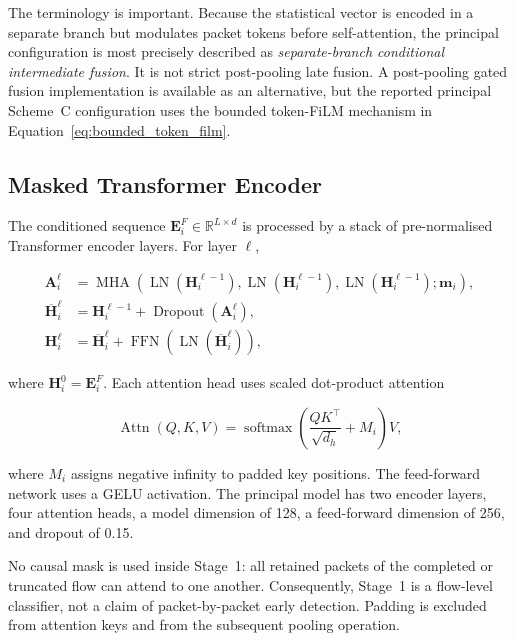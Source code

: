 \documentclass[11pt,fleqn]{report}
\begin{document}
The terminology is important. Because the statistical vector is encoded in a separate branch but modulates packet tokens before self-attention, the principal configuration is most precisely described as \emph{separate-branch conditional intermediate fusion}. It is not strict post-pooling late fusion. A post-pooling gated fusion implementation is available as an alternative, but the reported principal Scheme~C configuration uses the bounded token-FiLM mechanism in Equation~\ref{eq:bounded_token_film}.

\subsection{Masked Transformer Encoder}
\label{subsubsec:stage1_transformer}

The conditioned sequence $\mathbf{E}^{F}_i\in\mathbb{R}^{L\times d}$ is processed by a stack of pre-normalised Transformer encoder layers. For layer $\ell$,

\begin{align}
    \mathbf{A}^{\ell}_i
    &=\operatorname{MHA}
      \left(
        \operatorname{LN}(\mathbf{H}^{\ell-1}_i),
        \operatorname{LN}(\mathbf{H}^{\ell-1}_i),
        \operatorname{LN}(\mathbf{H}^{\ell-1}_i);
        \mathbf{m}_i
      \right),\\
    \overline{\mathbf{H}}^{\ell}_i
    &=\mathbf{H}^{\ell-1}_i
      +\operatorname{Dropout}(\mathbf{A}^{\ell}_i),\\
    \mathbf{H}^{\ell}_i
    &=\overline{\mathbf{H}}^{\ell}_i
      +\operatorname{FFN}
       \left(\operatorname{LN}(\overline{\mathbf{H}}^{\ell}_i)\right),
    \label{eq:stage1_transformer_layer}
\end{align}

where $\mathbf{H}^{0}_i=\mathbf{E}^{F}_i$. Each attention head uses scaled dot-product attention

\begin{equation}
    \operatorname{Attn}(Q,K,V)
    =\operatorname{softmax}
      \left(
        \frac{QK^{\top}}{\sqrt{d_h}}+M_i
      \right)V,
    \label{eq:scaled_dot_product_attention}
\end{equation}

where $M_i$ assigns negative infinity to padded key positions. The feed-forward network uses a GELU activation. The principal model has two encoder layers, four attention heads, a model dimension of 128, a feed-forward dimension of 256, and dropout of 0.15.

No causal mask is used inside Stage~1: all retained packets of the completed or truncated flow can attend to one another. Consequently, Stage~1 is a flow-level classifier, not a claim of packet-by-packet early detection. Padding is excluded from attention keys and from the subsequent pooling operation.
\end{document}
